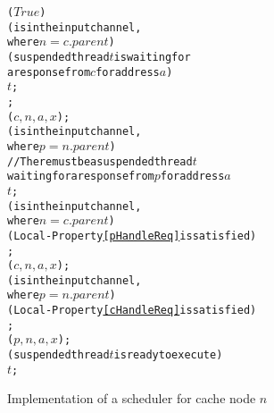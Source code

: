 \begin{figure}
\small
\begin{boxedminipage}{\linewidth}
\begin{alltt}
\normalfont
\lWhile{} (\(True\)) \bopen
      \lIf ( is in the input channel,
            where \(n = c.parent\)) \bopen
            \lIf (suspended thread \(t\) is waiting for 
                 a response from \(c\) for address \(a\)) \bopen
                   \resume{} \(t\);
            \bclose \lElse \bopen
                   \receive{} ;
                   \start{} \dRespL(\(c, n, a, x\));
            \bclose
      \bclose \lElsIf ( is in the input channel,
            where \(p = n.parent\)) \bopen
                   // There must be a suspended thread \(t\)
                   waiting for a response from \(p\) for address \(a\)
                   \resume{} \(t\);
            \bclose
      \bclose \lElsIf ( is in the input channel,
                     where \(n = c.parent\)) \bopen
             \lIf (Local-Property \ref{pHandleReq} is satisfied) \bopen
                   \receive{} ;
                   \start{} \uReq(\(c, n, a, x\));
             \bclose
      \bclose \lElsIf ( is in the input channel,
                  where \(p = n.parent\)) \bopen
             \lIf (Local-Property \ref{cHandleReq} is satisfied) \bopen
                   \receive{} ;
                   \start{} \dReq(\(p, n, a, x\));
             \bclose
      \bclose \lElsIf (suspended thread \(t\) is ready to execute) 
             \resume{} \(t\);
\bclose
\end{alltt}
\end{boxedminipage}
\caption{Implementation of a scheduler for cache node $n$}
\label{scheduler}
\end{figure}
